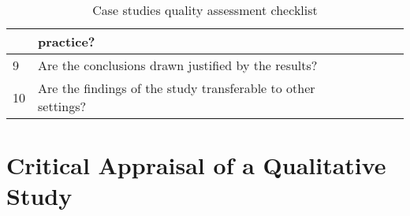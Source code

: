 \begin{table}[H]
\begin{center}
{\begin{tabular}{|l||l|l|l|l|}
                           & practice?                                                        &&& \\
                        \hline
                        9  & Are the conclusions drawn justified by the results?              &&& \\
                        \hline
                        10 & Are the findings of the study transferable to other settings?    &&& \\
                        \hline
                \end{tabular}}
        \end{center}
        \caption{Case studies quality assessment checklist}
        \label{table:caseStudy}
\end{table}
    

\section*{Critical Appraisal of a Qualitative Study}

